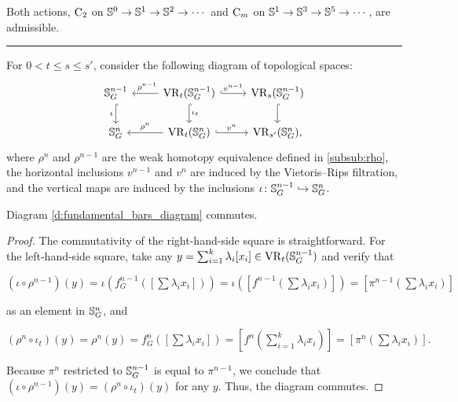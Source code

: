 
\lemma Both actions, \(\mathrm{C}_2\) on \(\mathbb{S}^0 \to \mathbb{S}^1 \to \mathbb{S}^2 \to \dotsb\) and \(\mathrm{C}_m\) on \(\mathbb{S}^1 \to \mathbb{S}^3 \to \mathbb{S}^5 \to \dotsb\), are admissible.


\noindent\rule{\textwidth}{0.4pt}

For $0 < t\leq s \leq s'$, consider the following diagram of topological spaces:
\begin{equation}\label{d:fundamental_bars_diagram}
	\begin{tikzcd}
		\bS^{n-1}_G
		\ar[d, hook,"{\iota}" left]
		&
		\VR_t(\bS^{n-1}_G)
		\ar[d, hook,"\iota_t"]
		\ar[l, "\ \rho^{n-1}" above]
		\ar[r, hook, "v^{n-1}"]
		&
		\VR_{s}(\bS^{n-1}_G)
		\ar[d, hook]
		\\
		\bS^{n}_G
		&
		\VR_t(\bS^{n}_G)
		\ar[l, "\rho^n" above]
		\ar[r, hook, "v^{n}"]
		&
		\VR_{s'}(\bS^{n}_G),
	\end{tikzcd}
\end{equation}
where $\rho^n$ and $\rho^{n-1}$ are the weak homotopy equivalence defined in \cref{subsub:rho}, the horizontal inclusions $v^{n-1}$ and $v^n$ are induced by the Vietoris--Rips filtration, and the vertical maps are induced by the inclusions $\iota \colon \mathbb{S}^{n-1}_G \hookrightarrow \mathbb{S}^{n}_G$.

\medskip\lemma
Diagram \eqref{d:fundamental_bars_diagram} commutes.

\begin{proof}
	The commutativity of the right-hand-side square is straightforward.
	For the left-hand-side square, take any $y = \sum_{i=1}^k \lambda_i [x_i] \in \operatorname{VR}_t(\mathbb{S}^{n-1}_G)$ and verify that
	\begin{center}
		$(\iota \circ \rho^{n-1})(y)
		=\iota(f^{n-1}_G([\sum \lambda_i x_i]))
		=\iota([f^{n-1}(\sum \lambda_i x_i)])
		=[\pi^{n-1}(\sum \lambda_i x_i)]
		$
	\end{center}
	as an element in $\mathbb{S}^n_G$, and
	\begin{center}
		$(\rho^{n} \circ \iota_t)(y) = \rho^{n}(y) = f^{n}_G([\sum \lambda_i x_i]) = [f^{n}(\sum_{i=1}^k \lambda_i x_i)] = [\pi^{n}(\sum \lambda_i x_i)].
		$
	\end{center}
	Because $\pi^{n}$ restricted to $\mathbb{S}^{n-1}_G$ is equal to $\pi^{n-1}$, we conclude that $(\iota \circ \rho^{n-1})(y) = (\rho^n \circ \iota_t)(y)$ for any $y$.
	Thus, the diagram commutes.
\end{proof}

